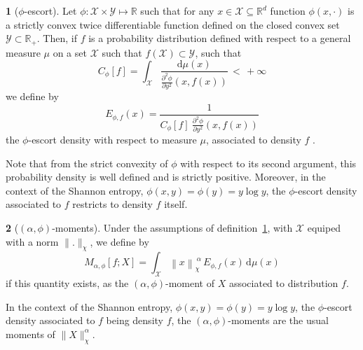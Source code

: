\documentclass[english,sort&compress]{elsarticle}
\theoremstyle{definition}
\newtheorem{defn}{\protect\definitionname}
\theoremstyle{plain}
\theoremstyle{plain}
\providecommand{\definitionname}{Definition}
\def\dmu{\mathrm{d}\mu}
\def\Rset{\mathbb{R}}
\def\X{\mathcal{X}}
\def\Y{\mathcal{Y}}
\begin{document}
\begin{defn}[$\phi$-escort]\label{def:phi-escort}
  Let $\phi: \X \times  \Y \mapsto \Rset$ such that for any  $x \in \X \subseteq
  \Rset^d$ function  $\phi(x,\cdot)$ is  a strictly convex  twice differentiable
  function defined on the closed convex  set $\Y \subset \Rset_+$.  Then, if $f$
  is a probability distribution defined  with respect to a general measure $\mu$
  on a set $\X$ such that $f(\X) \subset \Y$, such that
  \begin{equation}
\label{eq:Cphi}
  C_\phi[f]    =     \int_\X    \frac{\dmu(x)}{\frac{\partial^2    \phi}{\partial
      y^2}(x,f(x))} \, < \, + \infty
  \end{equation}
  we define by
  \begin{equation}\label{eq:phi-escort}
    E_{\phi,f}(x) = \frac{1}{\displaystyle C_\phi[f] \: \frac{\partial^2
    \phi}{\partial y^2}(x,f(x))}
  \end{equation}
  the $\phi$-escort density with respect to measure $\mu$, associated to density
  $f$ .
\end{defn}
%
Note  that from  the  strict convexity  of  $\phi$ with  respect  to its  second
argument,   this  probability   density  is   well  defined   and   is  strictly
positive. Moreover, in the context  of the Shannon entropy, $\phi(x,y) = \phi(y)
= y  \log y$, the $\phi$-escort  density associated to $f$  restricts to density
$f$ itself.

\begin{defn}[$(\alpha,\phi)$-moments]\label{def:phi-moment}
  Under  the assumptions of  definition~\ref{def:phi-escort}, with  $\X$ equiped
  with a norm $\|.\|_\chi$, we define by
  \begin{equation}\label{eq:phi-moment}
  M_{\alpha,\phi}[f;X] = \int_\X \left\| x \right\|_\chi^{\: \alpha} \,
  E_{\phi,f}(x) \, \dmu(x)
  \end{equation}
  if this  quantity exists, as  the $(\alpha,\phi)$-moment of $X$  associated to
  distribution $f$.
\end{defn}
%
In the  context of the Shannon  entropy, $\phi(x,y) =  \phi(y) = y \log  y$, the
$\phi$-escort   density    associated   to   $f$   being    density   $f$,   the
$(\alpha,\phi)$-moments are the usual moments of $\|X\|_\chi^\alpha$.
\end{document}
